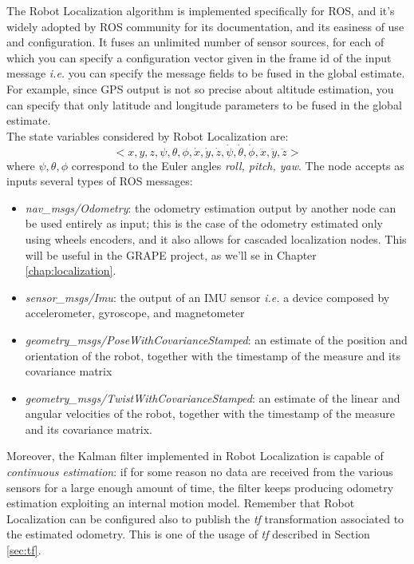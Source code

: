 The Robot Localization algorithm is implemented specifically for \ac{ROS}, and it's widely adopted by \ac{ROS} community for its documentation, and its easiness of use and configuration. It fuses an unlimited number of sensor sources, for each of which you can specify a configuration vector given in the frame id of the input message \textit{i.e.} you can specify the message fields to be fused in the global estimate. For example, since GPS output is not so precise about altitude estimation, you can specify that only latitude and longitude parameters to be fused in the global estimate. \\

The state variables considered by Robot Localization are:
\begin{equation}
	<x, y, z, \psi, \theta, \phi, \dot{x}, \dot{y}, \dot{z},\dot{\psi}, \dot{\theta}, \dot{\phi}, \ddot{x}, \ddot{y}, \ddot{z}>
	\label{eq:robotLocalizationState}
\end{equation}
where $ \psi, \theta, \phi$ correspond to the Euler angles \textit{roll, pitch, yaw}. 
The node accepts as inputs several types of \ac{ROS} messages:
\begin{itemize}
	\item \textit{nav\_msgs/Odometry}: the odometry estimation output by another node can be used entirely as input; this is the case of the odometry estimated only using wheels encoders, and it also allows for cascaded localization nodes. This will be useful in the \ac{GRAPE} project, as we'll se in Chapter \ref{chap:localization}.
	\item \textit{sensor\_msgs/Imu}: the output of an \ac{IMU} sensor \textit{i.e.} a device composed by accelerometer, gyroscope, and magnetometer
	\item \textit{geometry\_msgs/PoseWithCovarianceStamped}: an estimate of the position and orientation of the robot, together with the timestamp of the measure and its covariance matrix
	\item \textit{geometry\_msgs/TwistWithCovarianceStamped}: an estimate of the linear and angular velocities of the robot, together with the timestamp of the measure and its covariance matrix.
\end{itemize}
Moreover, the Kalman filter implemented in Robot Localization is capable of \textit{continuous estimation}: if for some reason no data are received from the various sensors for a large enough amount of time, the filter keeps producing odometry estimation exploiting an internal motion model. 
Remember that Robot Localization can be configured also to publish the \textit{tf} transformation associated to the estimated odometry. This is one of the usage of \textit{tf} described in Section \ref{sec:tf}.

